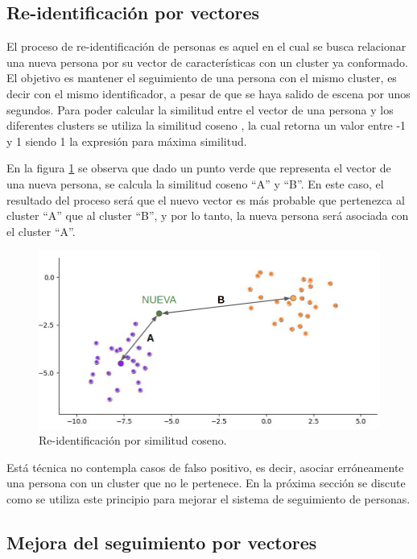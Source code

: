 \subsection{Re-identificación por vectores}

El proceso de re-identificación de personas es aquel en el cual se busca relacionar una nueva persona por su vector de características con un cluster ya conformado. El objetivo es mantener el seguimiento de una persona con el mismo cluster, es decir con el mismo identificador, a pesar de que se haya salido de escena por unos segundos. Para poder calcular la similitud entre el vector de una persona y los diferentes clusters se utiliza la similitud coseno \citep{COSINE_SIMILARITY}, la cual retorna un valor entre -1 y 1 siendo 1 la expresión para máxima similitud.

En la figura \ref{fig:similitudCoseno} se observa que dado un punto verde que representa el vector de una nueva persona, se calcula la similitud coseno ``A'' y ``B''. En este caso, el resultado del proceso será que el nuevo vector es más probable que pertenezca al cluster ``A'' que al cluster ``B'', y por lo tanto, la nueva persona será asociada con el cluster ``A''.

\begin{figure}[ht]
	\centering
	\includegraphics[scale=.6]{./Figures/similitudCoseno.png}
	\caption{Re-identificación por similitud coseno.}
	\label{fig:similitudCoseno}
\end{figure}

Está técnica no contempla casos de falso positivo, es decir, asociar erróneamente una persona con un cluster que no le pertenece. En la próxima sección se discute como se utiliza este principio para mejorar el sistema de seguimiento de personas.

\subsection{Mejora del seguimiento por vectores}

